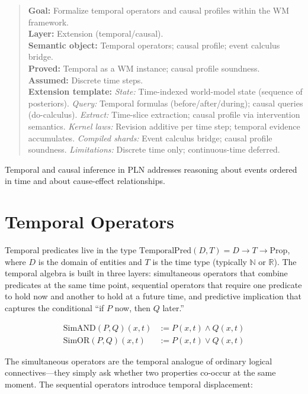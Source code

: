 \documentclass[11pt,openany]{report}
\begin{document}
\begin{quote}\small
\textbf{Goal:} Formalize temporal operators and causal profiles within the WM framework.\\
\textbf{Layer:} Extension (temporal/causal).\\
\textbf{Semantic object:} Temporal operators; causal profile; event calculus bridge.\\
\textbf{Proved:} Temporal as a WM instance; causal profile soundness.\\
\textbf{Assumed:} Discrete time steps.\\[4pt]
\textbf{Extension template:}
\textit{State:} Time-indexed world-model state (sequence of posteriors).
\textit{Query:} Temporal formulas (before/after/during); causal queries (do-calculus).
\textit{Extract:} Time-slice extraction; causal profile via intervention semantics.
\textit{Kernel laws:} Revision additive per time step; temporal evidence accumulates.
\textit{Compiled shards:} Event calculus bridge; causal profile soundness.
\textit{Limitations:} Discrete time only; continuous-time deferred.
\end{quote}

Temporal and causal inference in PLN addresses reasoning about events
ordered in time and about cause-effect relationships.

\section{Temporal Operators}

Temporal predicates live in the type
$\mathrm{TemporalPred}(D, T) = D \to T \to \mathrm{Prop}$,
where $D$ is the domain of entities and $T$ is the time type (typically
$\mathbb{N}$ or $\mathbb{R}$).  The temporal algebra is built in three
layers: simultaneous operators that combine predicates at the same time
point, sequential operators that require one predicate to hold now and
another to hold at a future time, and predictive implication that captures
the conditional ``if $P$ now, then $Q$ later.''

\begin{definition}
\begin{align}
  \mathrm{SimAND}(P, Q)(x, t) &:= P(x, t) \wedge Q(x, t) \\
  \mathrm{SimOR}(P, Q)(x, t)  &:= P(x, t) \vee Q(x, t)
\end{align}
\end{definition}

The simultaneous operators are the temporal analogue of ordinary logical
connectives---they simply ask whether two properties co-occur at the same
moment.  The sequential operators introduce temporal displacement:
\end{document}
